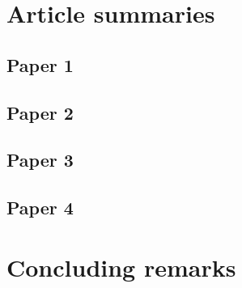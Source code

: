 \section{Article summaries} \label{Article summaries}

\subsection{Paper 1} \label{Paper 1}

\subsection{Paper 2} \label{Paper 2}

\subsection{Paper 3} \label{Paper 3}

\subsection{Paper 4} \label{Paper 4}

\section{Concluding remarks} \label{Concluding remarks}

\clearpage





